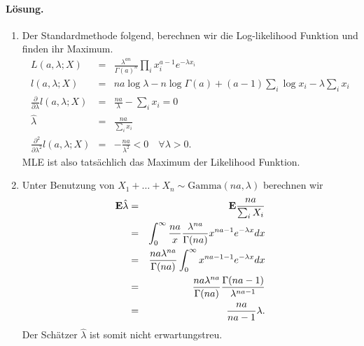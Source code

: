 \paragraph*{Lösung.}
\begin{enumerate}
    \item Der Standardmethode folgend, berechnen wir die Log-likelihood
        Funktion und finden ihr Maximum.
        \begin{eqnarray}
            L(a,\lambda; X) &=& \frac{\lambda^{an}}{\Gamma(a)^n} \prod_i x_i^{ a-1 } e^{-\lambda x_i} \\
            l(a,\lambda; X) &=& na \log \lambda - n \log \Gamma\left( a \right) + 
                                \left( a-1 \right) \sum_{i}^{} \log x_i - \lambda \sum_{i}^{} x_i \\
            \frac{\partial}{\partial \lambda} l(a,\lambda; X) &=&  \frac{na}{\lambda} - \sum_{i}^{} x_i = 0  \\
            \hat \lambda &=& \frac{na}{\sum_{i}^{} x_i} \\
            \frac{\partial^2}{\partial \lambda^2} l(a,\lambda; X) &=& - \frac{na}{ \lambda^2} <0 \quad \forall \lambda>0.
        \end{eqnarray}
        MLE ist also tatsächlich das Maximum der Likelihood Funktion. 
    \item Unter Benutzung von $X_1+ \ldots + X_n \sim \textrm{Gamma}(na,\lambda)$ berechnen wir
        \begin{eqnarray}
            \mathbf{E} \hat \lambda &=& \mathbf{E} \frac{na}{ \sum_{i}^{} X_i }  \\
            &=& \int_{0}^{\infty} \frac{na}{x} \frac{\lambda^{na}}{\Gamma(na)} x^{na-1} e^{-\lambda x} dx \\
            &=& \frac{na \lambda^{na}}{\Gamma(na)} \int_{0}^{\infty} x^{na -1-1} e^{-\lambda x}dx \\
            &=& \frac{na \lambda^{na}}{\Gamma(na)} \frac{\Gamma(na-1)}{\lambda^{na-1}} \\
            &=& \frac{na}{na-1} \lambda.
        \end{eqnarray}
        Der Schätzer $\hat\lambda$ ist somit nicht erwartungstreu.
\end{enumerate}










